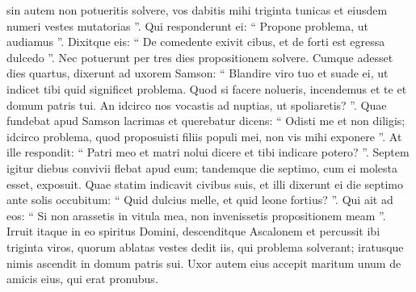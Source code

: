 \begin{biblechapter}
\begin{biblechapter}
\begin{biblechapter}
\begin{biblechapter}
\begin{biblechapter}
\begin{biblechapter}
\begin{biblechapter}
\begin{biblechapter}
\begin{biblechapter}
\begin{biblechapter}
\begin{biblechapter}
\begin{biblechapter}
\begin{biblechapter}
\begin{biblechapter}
\verse sin autem non potueritis solvere, vos dabitis mihi triginta tunicas et eiusdem numeri vestes mutatorias ”. Qui responderunt ei: “ Propone problema, ut audiamus ”. 
\verse Dixitque eis:
 “ De comedente exivit cibus,
 et de forti est egressa dulcedo ”.
 Nec potuerunt per tres dies propositionem solvere. 
\verse Cumque adesset dies quartus, dixerunt ad uxorem Samson: “ Blandire viro tuo et suade ei, ut indicet tibi quid significet problema. Quod si facere nolueris, incendemus et te et domum patris tui. An idcirco nos vocastis ad nuptias, ut spoliaretis? ”. 
\verse Quae fundebat apud Samson lacrimas et querebatur dicens: “ Odisti me et non diligis; idcirco problema, quod proposuisti filiis populi mei, non vis mihi exponere ”. At ille respondit: “ Patri meo et matri nolui dicere et tibi indicare potero? ”. 
\verse Septem igitur diebus convivii flebat apud eum; tandemque die septimo, cum ei molesta esset, exposuit. Quae statim indicavit civibus suis, 
\verse et illi dixerunt ei die septimo ante solis occubitum:
 “ Quid dulcius melle,
 et quid leone fortius? ”.
 Qui ait ad eos:
 “ Si non arassetis in vitula mea,
 non invenissetis propositionem meam ”.
 \verse Irruit itaque in eo spiritus Domini, descenditque Ascalonem et percussit ibi triginta viros, quorum ablatas vestes dedit iis, qui problema solverant; iratusque nimis ascendit in domum patris sui.
 \verse Uxor autem eius accepit maritum unum de amicis eius, qui erat pronubus.
 

\end{biblechapter}
\end{biblechapter}
\end{biblechapter}
\end{biblechapter}
\end{biblechapter}
\end{biblechapter}
\end{biblechapter}
\end{biblechapter}
\end{biblechapter}
\end{biblechapter}
\end{biblechapter}
\end{biblechapter}
\end{biblechapter}
\end{biblechapter}
